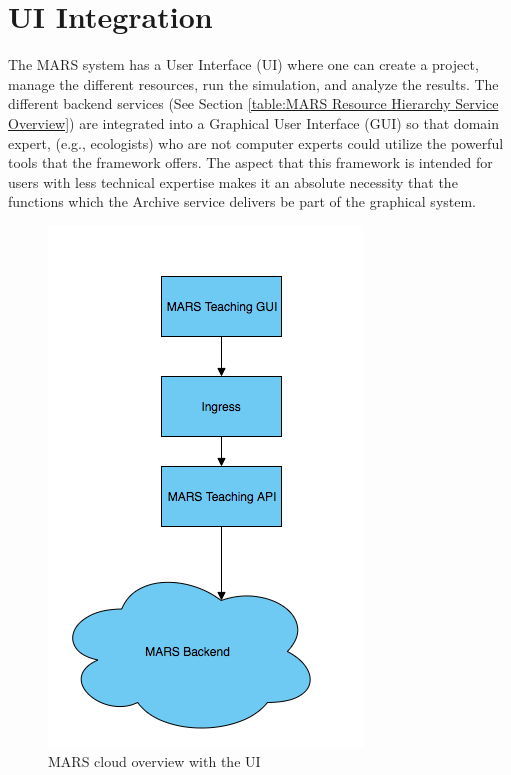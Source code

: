 \section{UI Integration}
The MARS system has a User Interface (UI) where one can create a project, manage the different resources, run the simulation, and
analyze the results. The different backend services (See Section \ref{table:MARS Resource Hierarchy Service Overview}) are integrated into a Graphical
User Interface (GUI) so that domain expert, (e.g., ecologists) who are not computer experts could utilize the powerful tools that the framework offers.
The aspect that this framework is intended for users with less technical expertise makes it an absolute necessity that
the functions which the Archive service delivers be part of the graphical system.

\begin{figure}[H]
    \centering \includegraphics[scale=0.6]{grafiken/marsIngress.png}
    \caption{MARS cloud overview with the UI}
    \label{fig:marsCloudUI}
\end{figure}

